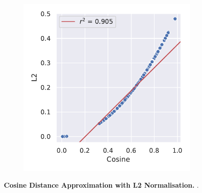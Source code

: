 \begin{figure}
\begin{adjustbox}{minipage=\dimexpr{}\fboxrule,fbox}
\begin{subfigure}[b]{0.475\textwidth}
            \label{subfig:Normalisation_UMAP}            \includegraphics[width=\textwidth]{UMAP/Difference_Distance_Calculation.pdf}
        \end{subfigure}
    \end{adjustbox}
    \caption[Cosine Distance Approximation with L2 Normalisation]{\textbf{Cosine Distance Approximation with L2 Normalisation.} .}
    \label{fig:Normalisation_Methods}
\end{figure}

\blindtext

\blindtext